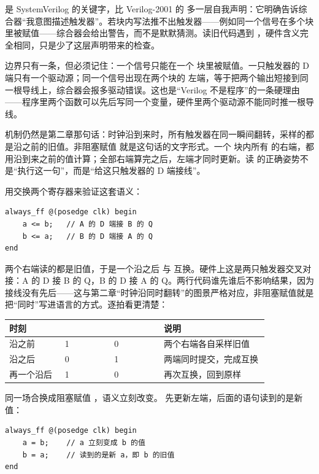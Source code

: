  是 SystemVerilog 的关键字，比 Verilog-2001 的  多一层自我声明：它明确告诉综合器“我意图描述触发器”。若块内写法推不出触发器——例如同一个信号在多个块里被赋值——综合器会给出警告，而不是默默猜测。读旧代码遇到 ，硬件含义完全相同，只是少了这层声明带来的检查。

边界只有一条，但必须记住：一个信号只能在一个  块里被赋值。一只触发器的 D 端只有一个驱动源；同一个信号出现在两个块的 \code{<=} 左端，等于把两个输出短接到同一根导线上，综合器会报多驱动错误。这也是“Verilog 不是程序”的一条硬理由——程序里两个函数可以先后写同一个变量，硬件里两个驱动源不能同时推一根导线。


机制仍然是第二章那句话：时钟沿到来时，所有触发器在同一瞬间翻转，采样的都是沿之前的旧值。非阻塞赋值 \code{<=} 就是这句话的文字形式。一个  块内所有 \code{<=} 的右端，都用沿到来之前的值计算；全部右端算完之后，左端才同时更新。读 \code{<=} 的正确姿势不是“执行这一句”，而是“给这只触发器的 D 端接线”。

用交换两个寄存器来验证这套语义：

\begin{lstlisting}
always_ff @(posedge clk) begin
    a <= b;   // A 的 D 端接 B 的 Q
    b <= a;   // B 的 D 端接 A 的 Q
end
\end{lstlisting}

两个右端读的都是旧值，于是一个沿之后  与  互换。硬件上这是两只触发器交叉对接：A 的 D 接 B 的 Q，B 的 D 接 A 的 Q。两行代码谁先谁后不影响结果，因为接线没有先后——这与第二章“时钟沿同时翻转”的图景严格对应，非阻塞赋值就是把“同时”写进语言的方式。逐拍看更清楚：

\begin{longtable}{L{0.18\linewidth}L{0.16\linewidth}L{0.16\linewidth}L{0.34\linewidth}}
\toprule
时刻 &  &  & 说明 \\
\midrule
沿之前 & 1 & 0 & 两个右端各自采样旧值 \\
沿之后 & 0 & 1 & 两端同时提交，完成互换 \\
再一个沿后 & 1 & 0 & 再次互换，回到原样 \\
\bottomrule
\end{longtable}

同一场合换成阻塞赋值 \code{=}，语义立刻改变。\code{=} 先更新左端，后面的语句读到的是新值：

\begin{lstlisting}
always_ff @(posedge clk) begin
    a = b;    // a 立刻变成 b 的值
    b = a;    // 读到的是新 a，即 b 的旧值
end
\end{lstlisting}

